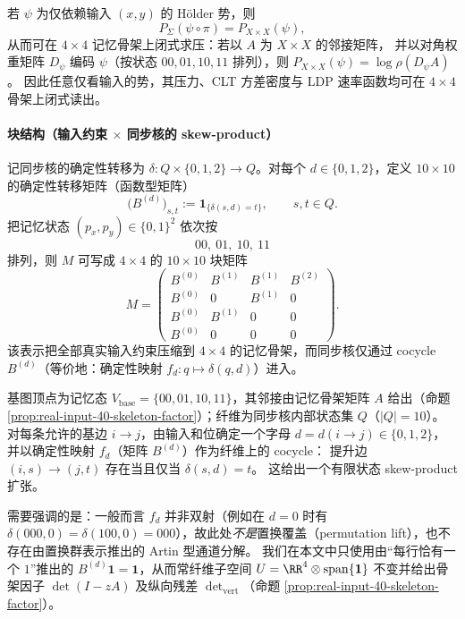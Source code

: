 \begin{corollary}[输入势的降维原则]\label{cor:real-input-40-input-potential-reduction}
若 $\psi$ 为仅依赖输入 $(x,y)$ 的 Hölder 势，则
\[
P_\Sigma(\psi\circ\pi)=P_{X\times X}(\psi),
\]
从而可在 $4\times 4$ 记忆骨架上闭式求压：若以 $A$ 为 $X\times X$ 的邻接矩阵，
并以对角权重矩阵 $D_\psi$ 编码 $\psi$（按状态 $00,01,10,11$ 排列），则
\(
P_{X\times X}(\psi)=\log\rho(D_\psi A)
\)。
因此任意仅看输入的势，其压力、CLT 方差密度与 LDP 速率函数均可在 $4\times 4$ 骨架上闭式读出。
\end{corollary}

\paragraph{块结构（输入约束 $\times$ 同步核的 skew-product）}
记同步核的确定性转移为 $\delta:Q\times\{0,1,2\}\to Q$。对每个 $d\in\{0,1,2\}$，定义 $10\times 10$ 的确定性转移矩阵（函数型矩阵）
\[
\bigl(B^{(d)}\bigr)_{s,t}:=\mathbf{1}_{\{\delta(s,d)=t\}},
\qquad s,t\in Q.
\]
把记忆状态 $(p_x,p_y)\in\{0,1\}^2$ 依次按
\[
00,\ 01,\ 10,\ 11
\]
排列，则 $M$ 可写成 $4\times 4$ 的 $10\times 10$ 块矩阵
\[
M=
\begin{pmatrix}
B^{(0)} & B^{(1)} & B^{(1)} & B^{(2)}\\
B^{(0)} & 0   & B^{(1)} & 0\\
B^{(0)} & B^{(1)} & 0   & 0\\
B^{(0)} & 0   & 0   & 0
\end{pmatrix}.
\]
该表示把全部真实输入约束压缩到 $4\times 4$ 的记忆骨架，而同步核仅通过 cocycle $B^{(d)}$（等价地：确定性映射 $f_d:q\mapsto\delta(q,d)$）进入。

\begin{remark}\label{rem:real-input-40-deterministic-lift}
基图顶点为记忆态 \(V_{\mathrm{base}}=\{00,01,10,11\}\)，其邻接由记忆骨架矩阵 \(A\) 给出（命题 \ref{prop:real-input-40-skeleton-factor}）；纤维为同步核内部状态集 \(Q\)（\(|Q|=10\)）。
对每条允许的基边 \(i\to j\)，由输入和位确定一个字母 \(d=d(i\to j)\in\{0,1,2\}\)，并以确定性映射 \(f_d\)（矩阵 \(B^{(d)}\)）作为纤维上的 cocycle：
提升边 \((i,s)\to(j,t)\) 存在当且仅当 \(\delta(s,d)=t\)。
这给出一个有限状态 skew-product 扩张。
\par
需要强调的是：一般而言 \(f_d\) 并非双射（例如在 $d=0$ 时有 \(\delta(000,0)=\delta(100,0)=000\)），故此处\emph{不是}置换覆盖（permutation lift），也不存在由置换群表示推出的 Artin 型通道分解。
我们在本文中只使用由“每行恰有一个 $1$”推出的 \(B^{(d)}\mathbf{1}=\mathbf{1}\)，从而常纤维子空间
\(
U=\RR^{4}\otimes \mathrm{span}\{\mathbf{1}\}
\)
不变并给出骨架因子 \(\det(I-zA)\) 及纵向残差 \(\det_{\mathrm{vert}}\)（命题 \ref{prop:real-input-40-skeleton-factor}）。
\end{remark}

